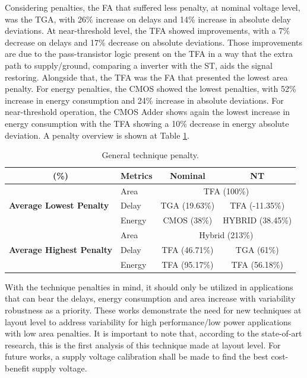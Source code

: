 \documentclass[ecp,tc, english]{iiufrgs}
\begin{document}
Considering penalties, the FA that suffered less penalty, at nominal voltage level, was the TGA, with 26\% increase on delays and 14\% increase in absolute delay deviations. At near-threshold level, the TFA showed improvements, with a 7\% decrease on delays and 17\% decrease on absolute deviations. Those improvements are due to the pass-transistor logic present on the TFA in a way that the extra path to supply/ground, comparing a inverter with the ST, aids the signal restoring. Alongside that, the TFA was the FA that presented the lowest area penalty. For energy penalties, the CMOS showed the lowest penalties, with 52\% increase in energy consumption and 24\% increase in absolute deviations. For near-threshold operation, the CMOS Adder shows again the lowest increase in energy consumption with the TFA showing a 10\% decrease in energy absolute deviation. A penalty overview is shown at Table \ref{penalty}.

\begin{table}[H]
\centering
\caption{General technique penalty.}
\label{penalty}
\begin{tabular}{llcc}
\hline
\multicolumn{1}{c}{\textbf{(\%)}} & \multicolumn{1}{c}{\textbf{Metrics}} & \textbf{Nominal} & \textbf{NT} \\ \hline
\multirow{3}{*}{\textbf{Average Lowest Penalty}} & Area & \multicolumn{2}{c}{TFA (100\%)} \\ \cline{2-4} 
 & Delay & TGA (19.63\%) & TFA (-11.35\%) \\ \cline{2-4} 
 & Energy & CMOS (38\%) & HYBRID (38.45\%) \\ \hline
\multirow{3}{*}{\textbf{Average Highest Penalty}} & Area & \multicolumn{2}{c}{Hybrid (213\%)} \\ \cline{2-4} 
 & Delay & TFA (46.71\%) & TGA (61\%) \\ \cline{2-4} 
 & Energy & TFA (95.17\%) & TFA (56.18\%) \\ \hline
\end{tabular}
\end{table}

With the technique penalties in mind, it should only be utilized in applications that can bear the delays, energy consumption and area increase with variability robustness as a priority. These works demonstrate the need for new techniques at layout level to address variability for high performance/low power applications with low area penalties. It is important to note that, according to the state-of-art research, this is the first analysis of this technique made at layout level. For future works, a supply voltage calibration shall be made to find the best cost-benefit supply voltage.
\end{document}
